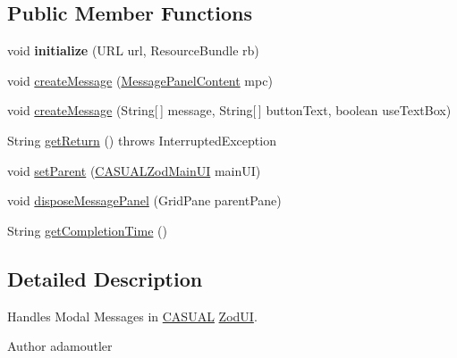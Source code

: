 \subsection*{Public Member Functions}
\begin{DoxyCompactItemize}
\item 
\hypertarget{classcom_1_1casual__dev_1_1zodui_1_1messagepanel_1_1_message_panel_controller_a84320515d06d846696151f81b435f752}{void {\bfseries initialize} (U\-R\-L url, Resource\-Bundle rb)}\label{classcom_1_1casual__dev_1_1zodui_1_1messagepanel_1_1_message_panel_controller_a84320515d06d846696151f81b435f752}

\item 
void \hyperlink{classcom_1_1casual__dev_1_1zodui_1_1messagepanel_1_1_message_panel_controller_aa3fb920dbac484fb5d12107dca632c2e}{create\-Message} (\hyperlink{classcom_1_1casual__dev_1_1zodui_1_1messagepanel_1_1_message_panel_content}{Message\-Panel\-Content} mpc)
\item 
void \hyperlink{classcom_1_1casual__dev_1_1zodui_1_1messagepanel_1_1_message_panel_controller_abad581a8a796537432c404722de2b575}{create\-Message} (String\mbox{[}$\,$\mbox{]} message, String\mbox{[}$\,$\mbox{]} button\-Text, boolean use\-Text\-Box)
\item 
String \hyperlink{classcom_1_1casual__dev_1_1zodui_1_1messagepanel_1_1_message_panel_controller_aafb379e277a61865014c7652ec58a2d3}{get\-Return} ()  throws Interrupted\-Exception 
\item 
void \hyperlink{classcom_1_1casual__dev_1_1zodui_1_1messagepanel_1_1_message_panel_controller_a7913055daa457d9aa2a64b037b0d5e7c}{set\-Parent} (\hyperlink{classcom_1_1casual__dev_1_1zodui_1_1_c_a_s_u_a_l_zod_main_u_i}{C\-A\-S\-U\-A\-L\-Zod\-Main\-U\-I} main\-U\-I)
\item 
void \hyperlink{classcom_1_1casual__dev_1_1zodui_1_1messagepanel_1_1_message_panel_controller_aa339de4f44c4610b9d4e9e71044d6520}{dispose\-Message\-Panel} (Grid\-Pane parent\-Pane)
\item 
String \hyperlink{classcom_1_1casual__dev_1_1zodui_1_1messagepanel_1_1_message_panel_controller_a7e429b387deb2ad38481498543933a70}{get\-Completion\-Time} ()
\end{DoxyCompactItemize}


\subsection{Detailed Description}
Handles Modal Messages in \hyperlink{namespace_c_a_s_u_a_l}{C\-A\-S\-U\-A\-L} \hyperlink{classcom_1_1casual__dev_1_1zodui_1_1_zod_u_i}{Zod\-U\-I}. \begin{DoxyAuthor}{Author}
adamoutler 
\end{DoxyAuthor}


